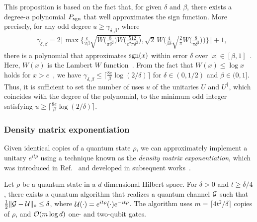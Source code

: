 This proposition is based on the fact that, for given $\delta$ and $\beta$, there exists a degree-$u$ polynomial $P_{\rm sgn}$ that well approximates the sign function.
More precisely, for any odd degree $u \geq \gamma_{\delta, \beta}$, where
\begin{align}
    &\gamma_{\delta, \beta} = 2 \Big\lceil\max\Big\{
    \frac{e}{2\beta} \sqrt{W\Big(\frac{8}{\pi\delta^2}\Big) W\Big(\frac{512}{e^2\pi\delta^2}\Big)}, \sqrt{2}\,W\Big(\frac{4}{\beta\delta}\sqrt{\frac{2}{\pi}W\Big(\frac{8}{\pi\delta^2}\Big)}\Big)\Big\}\Big\rceil + 1,
\end{align}
there is a polynomial that approximates $\mathrm{sgn}(x)$ within error $\delta$ over $|x| \in [\beta, 1]$~\cite{martyn2023efficient}.
Here, $W(x)$ is the Lambert $W$ function~\cite{Corless1996onthelambert}.
From the fact that $W(x) \leq \log x$ holds for $x > e$~\cite{Hassani2005Approximationlambert, Hoorfar2008inequlambert}, we have $\gamma_{\delta, \beta} \leq \big\lceil\frac{8e}{\beta}\log(2/\delta)\big\rceil$ for $\delta \in (0,1/2)$ and $\beta \in (0,1]$. 
Thus, it is sufficient to set the number of uses $u$ of the unitaries $U$ and $U^\dag$, which coincides with the degree of the polynomial, to the minimum odd integer satisfying $u \geq \big\lceil\frac{8e}{\beta}\log(2/\delta)\big\rceil$.











\subsubsection{Density matrix exponentiation}
\label{sec:DME intro}



Given identical copies of a quantum state $\rho$, we can approximately implement a unitary $e^{it\rho}$ using a technique known as the \emph{density matrix exponentiation}, which was introduced in Ref.~\cite{lloyd2014QuantPrincCompAnaly} and developed in subsequent works~\cite{marvian2016universalquantumemulator, kimmel2017HamSimSampleComp, wei2023DMEhermitianpreserv, go2024DMEsamplebased}.


\begin{theorem}
\label{prevthm:cntrl-DME}
Let $\rho$ be a quantum state in a $d$-dimensional Hilbert space.
For $\delta > 0$ and $t \geq \delta/4$, there exists a quantum algorithm that realizes a quantum channel ${\mathcal{G}}$ such that
$\frac{1}{2}\|{\mathcal{G}} - {\mathcal{U}}\|_\diamond \leq \delta$,
where ${\mathcal{U}}(\cdot) = e^{it\rho}(\cdot)e^{-it\rho}$.
The algorithm uses $m = \lceil4t^2/\delta\rceil$ copies of $\rho$, and ${\mathcal{O}}(m\log{d})$ one- and two-qubit gates.
\end{theorem}



